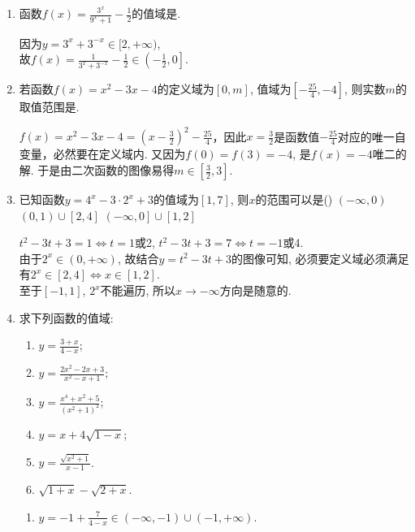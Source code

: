 \begin{enumerate}
\begin{jieda}
    \end{jieda}
    \item 函数$f(x)=\frac{3^x}{9^x+1}-\frac{1}{2}$的值域是\blkda{$\left(-\frac{1}{2},0\right]$}. 
    \begin{jieda}
    因为$y=3^x+3^{-x}\in[2,+\infty)$, \\
    故$f(x)=\frac{1}{3^x+3^{-x}}-\frac{1}{2}\in\left(-\frac{1}{2},0\right]$. 
    \end{jieda}
    \item 若函数$f(x)=x^2-3x-4$的定义域为$[0,m]$, 值域为$\left[-\frac{25}{4},-4\right]$, 则实数$m$的取值范围是\blkda{$[\frac{3}{2},3]$}. 
    \begin{jieda}
    $f(x)=x^2-3x-4=(x-\frac{3}{2})^2-\frac{25}{4}$，因此$x = \frac{3}{2}$是函数值$-\frac{25}{4}$对应的唯一自变量，必然要在定义域内. 又因为$f(0)=f(3)=-4$, 是$f(x)=-4$唯二的解. 于是由二次函数的图像易得$m\in[\frac{3}{2},3]$. 
    \end{jieda}
    \item 已知函数$y=4^x-3\cdot2^x+3$的值域为$\left[1,7\right]$, 则$x$的范围可以是\dotfill()
    \xx{$\left[2,4\right]$}
    {$(-\infty,0)$}
    {$(0,1)\cup\left[2,4\right]$}
    {$\left(-\infty,0\right]\cup\left[1,2\right]$}
    \begin{jieda}
    $t^2-3t+3=1\iff t=1$或2, $t^2-3t+3=7\iff t=-1$或4. \\
    由于$2^x\in(0,+\infty)$, 故结合$y=t^2-3t+3$的图像可知, 必须要定义域必须满足有$2^x\in[2,4]\iff x\in[1,2]$. \\
    至于$[-1,1]$, $2^x$不能遍历, 所以$x\to-\infty$方向是随意的. 
    \end{jieda}
    \item 求下列函数的值域: 
    \begin{enumerate}
    \item $y=\frac{3+x}{4-x}$; 
    \item $y=\frac{2x^2-2x+3}{x^2-x+1}$; 
    \item $y=\frac{x^4+x^2+5}{(x^2+1)^2}$; 
    \item $y=x+4\sqrt{1-x}$; 
    \item $y=\frac{\sqrt{x^2+1}}{x-1}$. 
    \item $\sqrt{1+x} - \sqrt{2+x}$.
    \end{enumerate}
    \begin{jieda}
    \begin{enumerate}
    \item $y=-1+\frac{7}{4-x}\in(-\infty,-1)\cup(-1,+\infty)$. 
    

\end{enumerate}
\end{jieda}
\end{enumerate}
